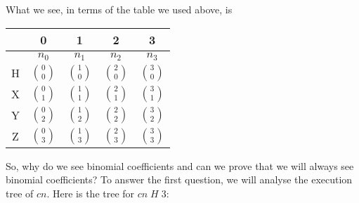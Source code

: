 \documentclass[tikz]{scrreprt}
\newcommand{\Conid}[1]{\mathit{#1}}
\newcommand{\Varid}[1]{\mathit{#1}}
\begin{document}
What we see, in terms of the table we used above, is

\begin{center}
\begingroup
\renewcommand{\arraystretch}{1.5}
\begin{tabular}{||c||c|c|c|c||}
\hline
     &  0    &  1    &  2    &  3   \\\hline
     & $n_0$ & $n_1$ & $n_2$ & $n_3$ \\\hline\hline
   H &$\binom{0}{0}$&$\binom{1}{0}$&$\binom{2}{0}$&$\binom{3}{0}$\\\hline
   X &$\binom{0}{1}$&$\binom{1}{1}$&$\binom{2}{1}$&$\binom{3}{1}$\\\hline
   Y &$\binom{0}{2}$&$\binom{1}{2}$&$\binom{2}{2}$&$\binom{3}{2}$\\\hline
   Z &$\binom{0}{3}$&$\binom{1}{3}$&$\binom{2}{3}$&$\binom{3}{3}$\\\hline
\end{tabular}
\endgroup
\end{center}

So, why do we see binomial coefficients and
can we prove that we will always see binomial coefficients?
To answer the first question, we will analyse the
execution tree of \ensuremath{\Varid{cn}}. Here is the tree for \ensuremath{\Varid{cn}\;\Conid{H}\;\mathrm{3}}:
\end{document}
